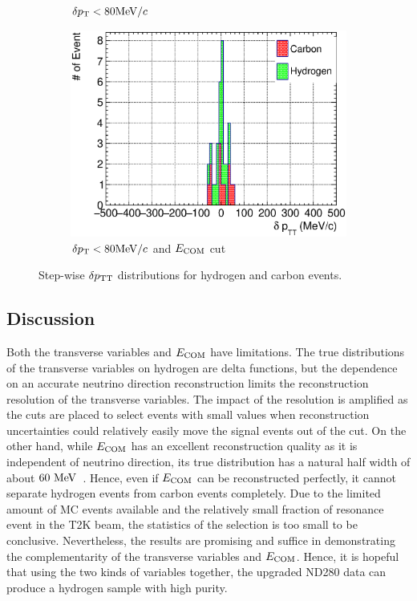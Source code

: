 \begin{figure}
\begin{subfigure}[b]{\trfigwid\textwidth}
          \caption{$\delta p_\textrm{T} < 80\textrm{MeV}/c$}
          \label{subfig:hsel-dang-dpt80}
     \end{subfigure}
     \begin{subfigure}[b]{\trfigwid\textwidth}
          \centering
          \includegraphics[width=\textwidth]{figures/perf/tki/SFGpTPCmu_dptt_stack_al15_GetH_dpt80_wdang.eps}
          \caption{$\delta p_\textrm{T} < 80\textrm{MeV}/c$ and $E_{\textrm{COM}}$ cut}
          \label{subfig:hsel-dang-dpt80-ecom}
     \end{subfigure}
     \caption{Step-wise $\delta p_\textrm{TT}$ distributions for hydrogen and carbon events.}
     \label{fig:hsel-dptt-step}
     \end{figure}

     \subsection{Discussion}
     Both the transverse variables and $E_{\textrm{COM}}$ have limitations.
     The true distributions of the transverse variables on hydrogen are delta functions, but the dependence on an accurate neutrino direction reconstruction limits the reconstruction resolution of the transverse variables.
     The impact of the resolution is amplified as the cuts are placed to select events with small values when reconstruction uncertainties could relatively easily move the signal events out of the cut.
     On the other hand, while $E_{\textrm{COM}}$ has an excellent reconstruction quality as it is independent of neutrino direction, its true distribution has a natural half width of about $60~\textrm{MeV}$~\cite{ParticleDataGroup:2024cfk}.
     Hence, even if $E_{\textrm{COM}}$ can be reconstructed perfectly, it cannot separate hydrogen events from carbon events completely.
     Due to the limited amount of MC events available and the relatively small fraction of resonance event in the T2K beam, the statistics of the selection is too small to be conclusive.
     Nevertheless, the results are promising and suffice in demonstrating the complementarity of the transverse variables and $E_{\textrm{COM}}$.
     Hence, it is hopeful that using the two kinds of variables together, the upgraded ND280 data can produce a hydrogen sample with high purity.
     


   

     
     